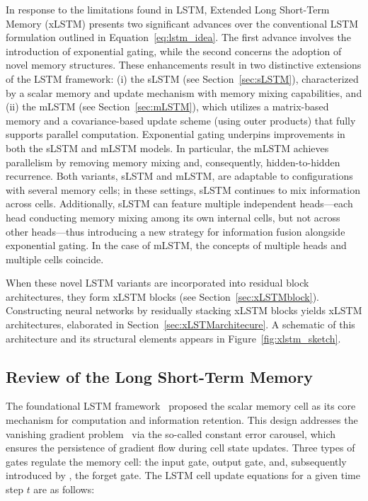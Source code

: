 In response to the limitations found in LSTM, Extended Long Short-Term Memory (xLSTM) presents two significant advances over the conventional LSTM formulation outlined in Equation~\eqref{eq:lstm_idea}. The first advance involves the introduction of exponential gating, while the second concerns the adoption of novel memory structures. These enhancements result in two distinctive extensions of the LSTM framework: (i) the sLSTM (see Section~\ref{sec:sLSTM}), characterized by a scalar memory and update mechanism with memory mixing capabilities, and (ii) the mLSTM (see Section~\ref{sec:mLSTM}), which utilizes a matrix-based memory and a covariance-based update scheme (using outer products) that fully supports parallel computation. Exponential gating underpins improvements in both the sLSTM and mLSTM models. In particular, the mLSTM achieves parallelism by removing memory mixing and, consequently, hidden-to-hidden recurrence. Both variants, sLSTM and mLSTM, are adaptable to configurations with several memory cells; in these settings, sLSTM continues to mix information across cells. Additionally, sLSTM can feature multiple independent heads—each head conducting memory mixing among its own internal cells, but not across other heads—thus introducing a new strategy for information fusion alongside exponential gating. In the case of mLSTM, the concepts of multiple heads and multiple cells coincide.

When these novel LSTM variants are incorporated into residual block architectures, they form xLSTM blocks (see Section~\ref{sec:xLSTMblock}). Constructing neural networks by residually stacking xLSTM blocks yields xLSTM architectures, elaborated in Section~\ref{sec:xLSTMarchitecure}. A schematic of this architecture and its structural elements appears in Figure~\ref{fig:xlstm_sketch}.

\subsection{Review of the Long Short-Term Memory}
\label{sec:orgLSTM}

The foundational LSTM framework~\citep{Hochreiter:91,Hochreiter:97nips,Hochreiter:97} proposed the scalar memory cell as its core mechanism for computation and information retention. This design addresses the vanishing gradient problem~\citep{Hochreiter:91,Hochreiter:00book} via the so-called constant error carousel, which ensures the persistence of gradient flow during cell state updates. Three types of gates regulate the memory cell: the input gate, output gate, and, subsequently introduced by \citet{Gers:00}, the forget gate. The LSTM cell update equations for a given time step $t$ are as follows:

